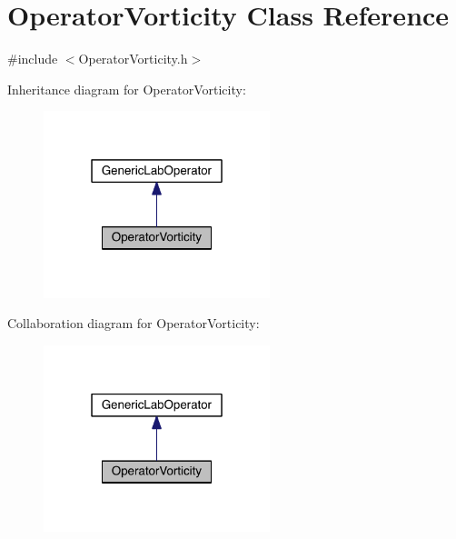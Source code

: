 \hypertarget{class_operator_vorticity}{}\section{Operator\+Vorticity Class Reference}
\label{class_operator_vorticity}


{\ttfamily \#include $<$Operator\+Vorticity.\+h$>$}



Inheritance diagram for Operator\+Vorticity\+:\nopagebreak
\begin{figure}[H]
\begin{center}
\leavevmode
\includegraphics[width=187pt]{d6/d9d/class_operator_vorticity__inherit__graph}
\end{center}
\end{figure}


Collaboration diagram for Operator\+Vorticity\+:\nopagebreak
\begin{figure}[H]
\begin{center}
\leavevmode
\includegraphics[width=187pt]{de/d01/class_operator_vorticity__coll__graph}
\end{center}
\end{figure}
